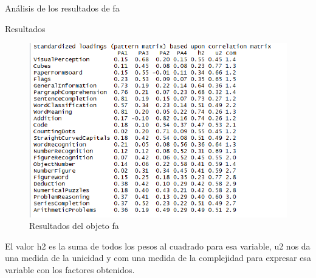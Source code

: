 \documentclass[10pt]{beamer}
\begin{document}
\begin{frame}[fragile]{Análisis de los resultados de fa}
\begin{alertblock}{Resultados}
	\begin{figure}
		\includegraphics[scale=0.4]{./Imagenes/res_fa.png}
		\caption{Resultados del objeto fa}
	\end{figure}
	El valor h2 es la suma de todos los pesos al cuadrado para esa variable, u2 nos da una medida de la unicidad y com una medida de la complejidad para expresar esa variable con los factores obtenidos.
\end{alertblock}
\end{frame}
\end{document}

